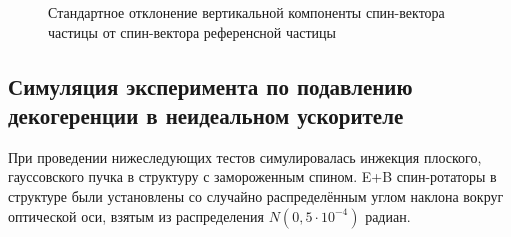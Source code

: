 \begin{figure}[h!]
	\centering
	\caption{Стандартное отклонение вертикальной компоненты спин-вектора частицы от спин-вектора референсной частицы\label{fig:decoh:SY_SD}}
\end{figure}

\subsection{Симуляция эксперимента по подавлению декогеренции  в неидеальном ускорителе}\label{sec:decoh:sim-imperfect}
При проведении нижеследующих тестов симулировалась инжекция
плоского, гауссовского пучка в структуру с замороженным
спином. E+B спин-ротаторы в структуре были установлены со случайно распределённым углом наклона вокруг оптической оси, взятым из распределения $N(0, 5\cdot10^{-4})$ радиан.

